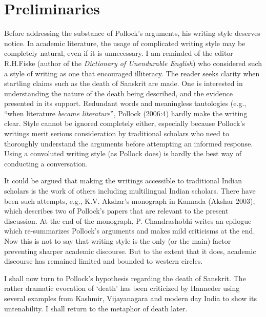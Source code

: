 \section{Preliminaries}

Before addressing the substance of Pollock’s arguments, his writing style deserves notice. In academic literature, the usage of complicated writing style may be completely natural, even if it is unnecessary. I am reminded of the editor R.H.Fiske (author of the {\sl Dictionary of Unendurable English}) who considered such a style of writing as one that encouraged illiteracy. The reader seeks clarity when startling claims such as the death of Sanskrit are made. One is interested in understanding the nature of the death being described, and the evidence presented in its support. Redundant words and meaningless tautologies (e.g., “when literature {\sl became literature}”, Pollock (2006:4) hardly make the writing clear. Style cannot be ignored completely either, especially because Pollock’s writings merit serious consideration by traditional scholars who need to thoroughly understand the arguments before attempting an informed response. Using a convoluted writing style (as Pollock does) is hardly the best way of conducting a conversation.

It could be argued that making the writings accessible to traditional Indian scholars is the work of others including multilingual Indian scholars. There have been such attempts, e.g., K.V. Akshar’s monograph in Kannada (Akshar 2003), which describes two of Pollock’s papers that are relevant to the present discussion. At the end of the monograph, P. Chandrashobhi writes an epilogue which re-summarizes Pollock’s arguments and makes mild criticisms at the end. Now this is not to say that writing style is the only (or the main) factor preventing sharper academic discourse. But to the extent that it does, academic discourse has remained limited and bounded to western circles. 

I shall now turn to Pollock’s hypothesis regarding the death of Sanskrit. The rather dramatic evocation of ‘death’ has been criticized by Hanneder using several examples from Kashmir, Vijayanagara and modern day India to show its untenability. I shall return to the metaphor of death later.


